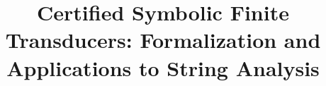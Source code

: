 \documentclass[sigplan,10pt,anonymous,review]{acmart}\settopmatter{printfolios=true,printccs=false,printacmref=false}
\begin{document}
\setlength{\pdfpageheight}{\paperheight}
\setlength{\pdfpagewidth}{\paperwidth}



\title{Certified Symbolic Finite Transducers: Formalization and Applications to
String Analysis}



\maketitle

%


















\end{document}
